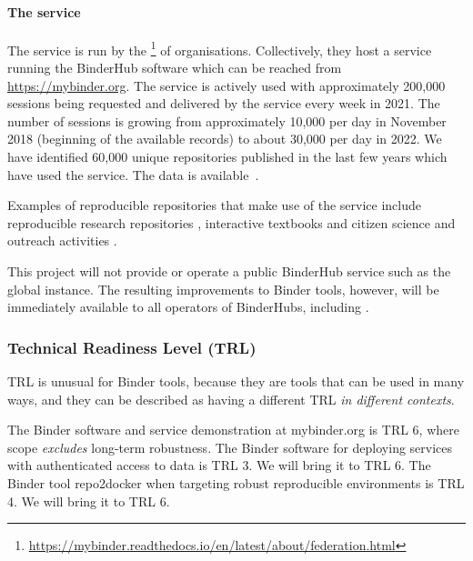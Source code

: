\paragraph{The \mybinder{} service}\label{sec:mybinder}

The \mybinder{} service is run by the \footnote{\url{https://mybinder.readthedocs.io/en/latest/about/federation.html}}
of organisations. Collectively, they host a service running the BinderHub software
which can be reached from \url{https://mybinder.org}.
The service is actively used with approximately 200,000 sessions being
requested and delivered by the \mybinder{} service every week in 2021. The number
of sessions is growing from approximately 10,000 per day in November 2018
(beginning of the available records) to about 30,000 per day in 2022. We have
identified 60,000 unique repositories published in the last few years which have
used the \mybinder{} service. The data is available~\cite{mybinder-archive}.

Examples of reproducible repositories that make use of the \mybinder{} service
include reproducible research repositories
\cite{GitHubRepoExampleAlbert2016,Beg2021}, interactive textbooks
\cite{Fangohr2022,Zeller2022} and citizen science and outreach activities
\cite{ligo-open-science,OSCOVIDA2022}.

This \TheProject{} project will not provide or operate a public BinderHub service such as the global
\mybinder{} instance. The resulting improvements to Binder tools, however, will be
immediately available to all operators of BinderHubs, including \mybinder{}.


\subsubsection{Technical Readiness Level (TRL)}

TRL is unusual for Binder tools, because they are tools that can be used in many ways,
and they can be described as having a different TRL \emph{in different contexts}.

The Binder software and service demonstration at mybinder.org is TRL 6,
where scope \emph{excludes} long-term robustness.
The Binder software for deploying services with authenticated access to data is TRL 3.
We will bring it to TRL 6.
The Binder tool repo2docker when targeting robust reproducible environments is TRL 4.
We will bring it to TRL 6.


